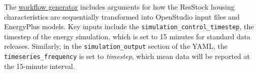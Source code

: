 The \href{https://buildstockbatch.readthedocs.io/en/v2023.10.0/project_defn.html#workflow-generator}{workflow generator} includes arguments for how the ResStock housing characteristics are sequentially transformed into OpenStudio input files and EnergyPlus models. Key inputs include the \texttt{simulation\_control\_timestep}, the timestep of the energy simulation, which is set to 15 minutes for standard data releases. Similarly, in the \texttt{simulation\_output} section of the YAML, the \texttt{timeseries\_frequency} is set to \textit{timestep}, which mean data will be reported at the 15-minute interval. 
